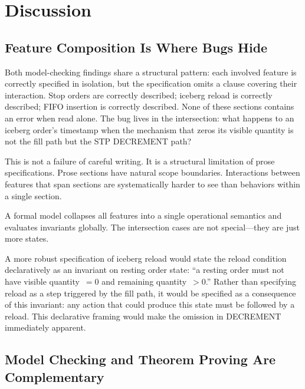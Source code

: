 \documentclass[11pt,a4paper]{article}
\begin{document}
\section{Discussion}
\label{sec:lessons}

\subsection{Feature Composition Is Where Bugs Hide}
\label{sec:lessons-composition}

Both model-checking findings share a structural pattern: each involved
feature is correctly specified in isolation, but the specification omits
a clause covering their interaction. Stop orders are correctly
described; iceberg reload is correctly described; FIFO insertion is
correctly described. None of these sections contains an error when read
alone. The bug lives in the intersection: what happens to an iceberg
order's timestamp when the mechanism that zeros its visible quantity is
not the fill path but the STP DECREMENT path?

This is not a failure of careful writing. It is a structural limitation
of prose specifications. Prose sections have natural scope boundaries.
Interactions between features that span sections are systematically
harder to see than behaviors within a single section.

A formal model collapses all features into a single operational
semantics and evaluates invariants globally. The intersection cases are
not special---they are just more states.

A more robust specification of iceberg reload would state the reload
condition declaratively as an invariant on resting order state:
``a resting order must not have visible quantity~$= 0$ and remaining
quantity~$> 0$.'' Rather than specifying reload as a step triggered by
the fill path, it would be specified as a consequence of this invariant:
any action that could produce this state must be followed by a reload.
This declarative framing would make the omission in DECREMENT
immediately apparent.

\subsection{Model Checking and Theorem Proving Are Complementary}
\label{sec:lessons-complementary}
\end{document}

